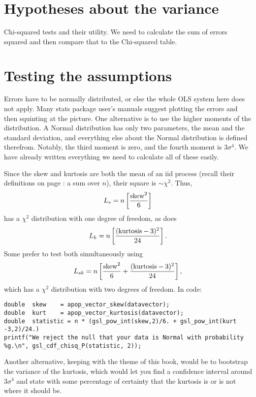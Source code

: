 \section{Hypotheses about the variance}
Chi-squared tests and their utility. We need to calculate the sum of errors squared 
and then compare that to the Chi-squared table. 


\section{Testing the assumptions} Errors have to be normally distributed, or else
the whole OLS system here does not apply. Many stats package user's manuals
suggest plotting the errors and then squinting at the picture. One
alternative is to use the higher moments of the distribution.
A Normal distribution has only two parameters,  the mean and the
standard deviation, and everything else about the Normal distribution is
defined therefrom. Notably, the third moment is zero, and the fourth
moment is $3 \sigma^4$. We have already written everything we need to
calculate all of these easily.


Since the skew and kurtosis are both the mean of an iid process (recall
their definitions on page \pageref{kurtskew}: a sum over $n$), their
square is $\sim \chi^2$. Thus,
$$L_s = n\left[{{\rm skew}^2\over 6}\right]$$
has a $\chi^2$ distribution with one degree of freedom, as does
$$L_k = n\left[{({\rm kurtosis}-3)^2\over 24}\right].$$
Some prefer to test both simultaneously using
$$L_{sk} = n\left[{{\rm skew}^2\over 6} + {({\rm kurtosis}-3)^2\over 24}\right],$$
which has a $\chi^2$ distribution with two degrees of freedom. In code:

\begin{lstlisting}
double  skew    = apop_vector_skew(datavector);
double  kurt    = apop_vector_kurtosis(datavector);
double  statistic = n * (gsl_pow_int(skew,2)/6. + gsl_pow_int(kurt -3,2)/24.)
printf("We reject the null that your data is Normal with probability %g.\n", gsl_cdf_chisq_P(statistic, 2));
\end{lstlisting}

Another alternative, keeping with the theme of this book, would be
to bootstrap the variance of the kurtosis, which would let you find a
confidence interval around $3 \sigma^4$ and state with some percentage
of certainty that the kurtosis is or is not where it should be.
